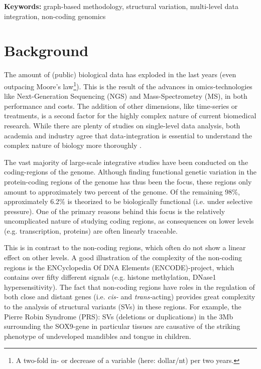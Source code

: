 \documentclass[twoside,fontsize=12pt]{article}
\begin{document}
\noindent \textbf{Keywords:} graph-based methodology, structural variation, multi-level data integration, non-coding genomics

\newpage

\section*{Background}
The amount of (public) biological data has exploded in the last years (even outpacing Moore's law\footnote{A two-fold in- or decrease of a variable (here: dollar/nt) per two years.}). This is the result of the advances in omics-technologies like Next-Generation Sequencing (NGS) and Mass-Spectrometry (MS), in both performance and costs. The addition of other dimensions, like time-series or treatments, is a second factor for the highly complex nature of current biomedical research. While there are plenty of studies on single-level data analysis, both academia and industry agree that data-integration is essential to understand the complex nature of biology more thoroughly \citep{Gomez-Cabrero2014, Huttenhower2010, Searls2005, Hamid2009}. 

The vast majority of large-scale integrative studies have been conducted on the coding-regions of the genome\cite{ENCODE}. Although finding functional genetic variation in the protein-coding regions of the genome has thus been the focus, these regions only amount to approximately two percent of the genome\cite{Lander2001}. Of the remaining 98\%, approximately 6.2\% is theorized to be biologically functional (i.e. under selective pressure)\cite{Rands2014}. One of the primary reasons behind this focus is the relatively uncomplicated nature of studying coding regions, as consequences on lower levels (e.g. transcription, proteins) are often linearly traceable\cite{McLaren2010}. 

This is in contrast to the non-coding regions, which often do not show a linear effect on other levels\cite{Bird2006}. A good illustration of the complexity of the non-coding regions is the ENCyclopedia Of DNA Elements (ENCODE)-project\cite{ENCODE}, which contains over fifty different signals (e.g. histone methylation, DNase1 hypersensitivity). The fact that non-coding regions have roles in the regulation of both close and distant genes (i.e. \textit{cis-} and \textit{trans-}acting) provides great complexity to the analysis of structural variants (SVs) in these regions. For example, the Pierre Robin Syndrome (PRS): SVs (deletions or duplications) in the 3Mb surrounding the SOX9-gene in particular tissues are causative of the striking phenotype of undeveloped mandibles and tongue in children\cite{Benko2009,Kurth2009}. 
\medskip
\end{document}

